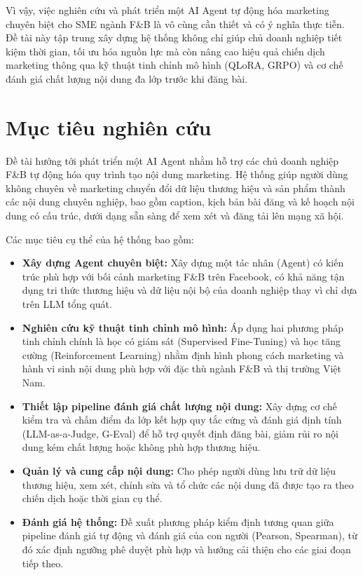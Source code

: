 Vì vậy, việc nghiên cứu và phát triển một AI Agent tự động hóa marketing
chuyên biệt cho SME ngành F\&B là vô cùng cần thiết và có ý nghĩa thực
tiễn. Đề tài này tập trung xây dựng hệ thống không chỉ giúp chủ doanh
nghiệp tiết kiệm thời gian, tối ưu hóa nguồn lực mà còn nâng cao hiệu
quả chiến dịch marketing thông qua kỹ thuật tinh chỉnh mô hình (QLoRA,
GRPO) và cơ chế đánh giá chất lượng nội dung đa lớp trước khi đăng bài.

\section{Mục tiêu nghiên cứu}\label{sec:muc-tieu}

Đề tài hướng tới phát triển một AI Agent nhằm hỗ trợ các chủ doanh
nghiệp F\&B tự động hóa quy trình tạo nội dung marketing. Hệ thống giúp
người dùng không chuyên về marketing chuyển đổi dữ liệu thương hiệu và
sản phẩm thành các nội dung chuyên nghiệp, bao gồm caption, kịch bản bài
đăng và kế hoạch nội dung có cấu trúc, dưới dạng sẵn sàng để xem xét và
đăng tải lên mạng xã hội.

Các mục tiêu cụ thể của hệ thống bao gồm:

\begin{itemize}
\item
  \textbf{Xây dựng Agent chuyên biệt:} Xây dựng một tác nhân (Agent) có
  kiến trúc phù hợp với bối cảnh marketing F\&B trên Facebook, có khả
  năng tận dụng tri thức thương hiệu và dữ liệu nội bộ của doanh nghiệp
  thay vì chỉ dựa trên LLM tổng quát.

\item
  \textbf{Nghiên cứu kỹ thuật tinh chỉnh mô hình:} Áp dụng
  hai phương pháp tinh chỉnh chính là học có giám sát (Supervised Fine-Tuning) và học tăng cường (Reinforcement Learning) nhằm định hình phong cách
  marketing và hành vi sinh nội dung phù hợp với đặc thù ngành F\&B và
  thị trường Việt Nam.

\item
  \textbf{Thiết lập pipeline đánh giá chất lượng nội dung:} Xây dựng cơ
  chế kiểm tra và chấm điểm đa lớp kết hợp quy tắc cứng và đánh giá định tính (LLM-as-a-Judge, G-Eval) để hỗ trợ quyết
  định đăng bài, giảm rủi ro nội dung kém chất lượng hoặc không phù hợp
  thương hiệu.

\item
  \textbf{Quản lý và cung cấp nội dung:} Cho phép người dùng lưu trữ dữ
  liệu thương hiệu, xem xét, chỉnh sửa và tổ chức các nội dung đã được
  tạo ra theo chiến dịch hoặc thời gian cụ thể.

\item
  \textbf{Đánh giá hệ thống:} Đề xuất phương pháp kiểm định tương quan
  giữa pipeline đánh giá tự động và đánh giá của con người (Pearson,
  Spearman), từ đó xác định ngưỡng phê duyệt phù hợp và hướng cải thiện
  cho các giai đoạn tiếp theo.
\end{itemize}

